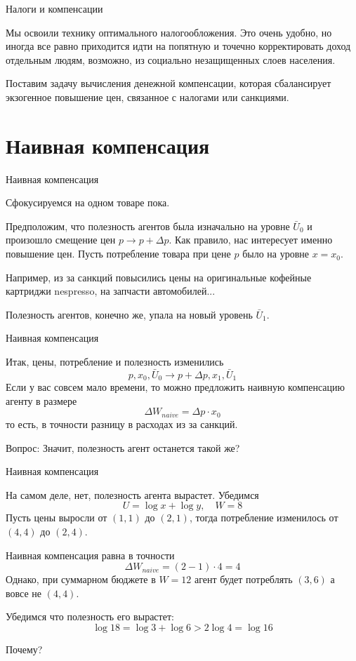 \documentclass{beamer}
\begin{document}
\begin{frame}{Налоги и компенсации}

Мы освоили технику оптимального налогообложения. Это очень удобно, но иногда все равно приходится идти на попятную и точечно корректировать доход отдельным людям, возможно, из социально незащищенных слоев населения.

Поставим задачу вычисления денежной компенсации, которая сбалансирует экзогенное повышение цен, связанное с \alert{налогами} или \alert{санкциями}.

\end{frame}

\section{Наивная компенсация}

\begin{frame}{Наивная компенсация}

Сфокусируемся на одном товаре пока.

Предположим, что полезность агентов была изначально на уровне $\bar U_0$ и произошло смещение цен $p \to p+\Delta p$. Как правило, нас интересует именно повышение цен. Пусть потребление товара при цене $p$ было на уровне $x = x_0$.

Например, из за санкций повысились цены на оригинальные кофейные картриджи nespresso, на запчасти автомобилей...

Полезность агентов, конечно же, упала на новый уровень $\bar U_1$.

\end{frame}

\begin{frame}{Наивная компенсация}

Итак, цены, потребление и полезность изменились $$p, x_0, \bar U_0 \to p + \Delta p, x_1, \bar U_1$$
Если у вас совсем мало времени, то можно предложить наивную компенсацию агенту в размере $$\Delta W_{naive} = \Delta p \cdot x_0$$ то есть, в точности разницу в расходах из за санкций.

Вопрос: \alert{Значит, полезность агент останется такой же?}

\end{frame}

\begin{frame}{Наивная компенсация}

На самом деле, нет, полезность агента вырастет. Убедимся
$$ U = \log x + \log y, \quad W = 8$$
Пусть цены выросли от $(1,1)$ до $(2,1)$, тогда потребление изменилось от $(4,4)$ до $(2,4)$. 

Наивная компенсация равна в точности
$$ \Delta W_{naive} = (2-1) \cdot 4 = 4$$
Однако, при суммарном бюджете в $W=12$ агент будет потреблять $(3,6)$ а вовсе не $(4,4)$. 

Убедимся что полезность его вырастет: $$ \log 18 =\log 3 + \log 6 > 2 \log 4 = \log 16$$

\alert{Почему?}

\end{frame}
\end{document}
